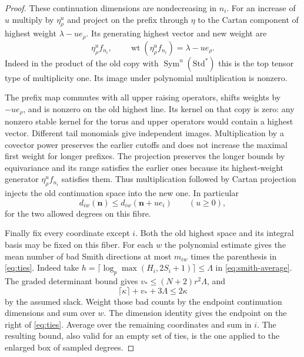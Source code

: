 \begin{proof}
These continuation dimensions are nondecreasing in \(n_i\).
For an increase of \(u\) multiply by \(\eta_\rho^u\) and project
on the prefix through \(\eta\) to the Cartan component of highest
weight \(\lambda-u e_\rho\). Its generating highest vector and new weight are
\[
 \eta_\rho^u f_{n_i},\qquad \operatorname{wt}(\eta_\rho^u f_{n_i})=\lambda-u e_\rho.
\]
Indeed in the product of the old
copy with \(\operatorname{Sym}^u(\mathrm{Std}^*)\) this is the
top tensor type of multiplicity one. Its image under polynomial
multiplication is nonzero.

The prefix map commutes with all upper
raising operators, shifts weights by \(-u e_\rho\), and is
nonzero on the old highest line. Its kernel on that copy is
zero: any nonzero stable kernel for the torus and upper
operators would contain a highest vector. Different tail
monomials give independent images. Multiplication by a
covector power preserves the earlier cutoffs and does not
increase the maximal first weight for longer prefixes.
The projection preserves the longer bounds by equivariance
and its range satisfies the earlier ones because its highest-weight generator \(\eta_\rho^u f_{n_i}\) satisfies them. Thus multiplication followed by Cartan projection injects the old continuation space into the new one. In particular
\[
 d_{iw}(\mathbf n)\le d_{iw}(\mathbf n+u e_i)\qquad(u\ge0),
\]
for the two allowed degrees on this fibre.

Finally fix every coordinate except \(i\). Both the old highest
space and its integral basis may be fixed on this fiber.
For each \(w\) the polynomial estimate gives the mean number
of bad Smith directions at most \(m_{iw}\) times the parenthesis
in \eqref{eq:ties}. Indeed take \(h=\lceil\log_p
\max(H_i,2S_i+1)\rceil\le\Lambda\) in
\eqref{eq:smith-average}. The graded determinant bound gives
\(v_*\le(N+2)r^2\Lambda\), and
\[
 \lceil\kappa\rceil+v_*+3\Lambda\le2\kappa
\]
by the assumed
slack. Weight those bad counts by the endpoint continuation
dimensions and sum over \(w\). The dimension identity gives
the endpoint on the right of \eqref{eq:ties}. Average over the remaining coordinates and sum in \(i\). The resulting bound, also valid for an empty set of ties, is the one applied to the enlarged box of sampled degrees.
\end{proof}
